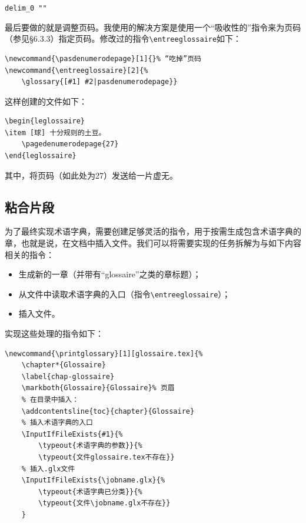 \begin{dmd}
\verb|delim_0 ""|
\end{dmd}

最后要做的就是调整页码。我使用的解决方案是使用一个“吸收性的”指令来为页码（参见\S 6.3.3）指定页码。修改过的指令\verb|\entreeglossaire|如下：

\begin{dmd}
\begin{verbatim}
\newcommand{\pasdenumerodepage}[1]{}% “吃掉”页码
\newcommand{\entreeglossaire}[2]{%
    \glossary{[#1] #2|pasdenumerodepage}}\end{verbatim}
\end{dmd}

这样创建的文件如下：

\begin{dmd}
\begin{verbatim}
\begin{leglossaire}
\item [球] 十分规则的土豆。
    \pagedenumerodepage{27}
\end{leglossaire}\end{verbatim}
\end{dmd}

其中，将页码（如此处为27）发送给一片虚无。

\subsection{粘合片段}

为了最终实现术语字典，需要创建足够灵活的指令，用于按需生成包含术语字典的章，也就是说，在文档中插入文件。我们可以将需要实现的任务拆解为与如下内容相关的指令：

\begin{itemize}
    \item 生成新的一章（并带有“glossaire”之类的章标题）；
    \item 从文件中读取术语字典的入口（指令\verb|\entreeglossaire|）；
    \item 插入文件。
\end{itemize}

实现这些处理的指令如下：

\begin{dmd}
\begin{verbatim}
\newcommand{\printglossary}[1][glossaire.tex]{% 
    \chapter*{Glossaire}
    \label{chap-glossaire} 
    \markboth{Glossaire}{Glossaire}% 页眉
    % 在目录中插入：
    \addcontentsline{toc}{chapter}{Glossaire}
    % 插入术语字典的入口
    \InputIfFileExists{#1}{%
        \typeout{术语字典的参数}}{%
        \typeout{文件glossaire.tex不存在}}
    % 插入.glx文件
    \InputIfFileExists{\jobname.glx}{%
        \typeout{术语字典已分类}}{%
        \typeout{文件\jobname.glx不存在}}
    }\end{verbatim}
\end{dmd}

